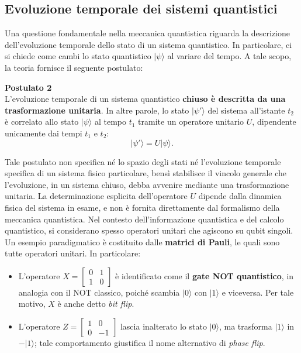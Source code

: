 \documentclass[a4paper,12pt]{report}
\theoremstyle{plain}
\begin{document}
\subsection{Evoluzione temporale dei sistemi quantistici}
Una questione fondamentale nella meccanica quantistica riguarda la descrizione dell'evoluzione temporale dello stato di un sistema quantistico. In particolare, ci si chiede come cambi lo stato quantistico \(|\psi\rangle\) al variare del tempo. A tale scopo, la teoria fornisce il seguente postulato:
\begin{framed}
\textbf{Postulato 2} \\
L'evoluzione temporale di un sistema quantistico \textbf{chiuso è descritta da una trasformazione unitaria}. In altre parole, lo stato \(|\psi'\rangle\) del sistema all'istante \(t_2\) è correlato allo stato \(|\psi\rangle\) al tempo \(t_1\) tramite un operatore unitario \(U\), dipendente unicamente dai tempi \(t_1\) e \(t_2\):
\[
|\psi'\rangle = U|\psi\rangle.
\]
\end{framed}
Tale postulato non specifica né lo spazio degli stati né l'evoluzione temporale specifica di un sistema fisico particolare, bensì stabilisce il vincolo generale che l'evoluzione, in un sistema chiuso, debba avvenire mediante una trasformazione unitaria. La determinazione esplicita dell'operatore \(U\) dipende dalla dinamica fisica del sistema in esame, e non è fornita direttamente dal formalismo della meccanica quantistica.
Nel contesto dell'informazione quantistica e del calcolo quantistico, si considerano spesso operatori unitari che agiscono su qubit singoli. Un esempio paradigmatico è costituito dalle \textbf{matrici di Pauli}, le quali sono tutte operatori unitari. In particolare:
\begin{itemize}
    \item L'operatore \(X = \begin{bmatrix} 0 & 1 \\ 1 & 0 \end{bmatrix}\) è identificato come il \textbf{gate NOT quantistico}, in analogia con il NOT classico, poiché scambia \(|0\rangle\) con \(|1\rangle\) e viceversa. Per tale motivo, \(X\) è anche detto \textit{bit flip}.
    
    \item L'operatore \(Z = \begin{bmatrix} 1 & 0 \\ 0 & -1 \end{bmatrix}\) lascia inalterato lo stato \(|0\rangle\), ma trasforma \(|1\rangle\) in \(-|1\rangle\); tale comportamento giustifica il nome alternativo di \textit{phase flip}.
\end{itemize}
\end{document}
